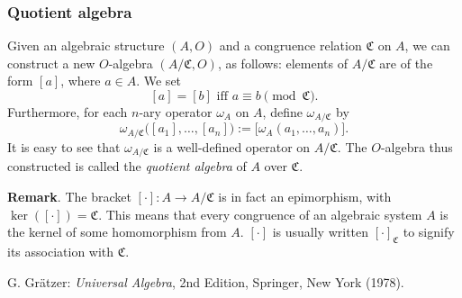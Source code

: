 \documentclass[12pt]{article}
\begin{document}
\subsubsection*{Quotient algebra}

Given an algebraic structure $(A,O)$ and a congruence relation $\mathfrak{C}$ on $A$, we can construct a new $O$-algebra $(A/\mathfrak{C},O)$, as follows: elements of $A/\mathfrak{C}$ are of the form $[a]$, where $a\in A$.  We set $$[a]=[b]\mbox{ iff }a\equiv b\pmod {\mathfrak{C}}.$$  Furthermore, for each $n$-ary operator $\omega_A$ on $A$, define $\omega_{A/\mathfrak{C}}$ by $$\omega_{A/\mathfrak{C}}\big([a_1],\ldots,[a_n]\big):=\big[\omega_A(a_1,\ldots,a_n)\big].$$  It is easy to see that $\omega_{A/\mathfrak{C}}$ is a well-defined operator on $A/\mathfrak{C}$.  The $O$-algebra thus constructed is called the \emph{quotient algebra} of $A$ over $\mathfrak{C}$.

\textbf{Remark}.  The bracket $[\cdot]:A\to A/\mathfrak{C}$ is in fact an epimorphism, with  $\ker([\cdot])=\mathfrak{C}$.  This means that every congruence of an algebraic system $A$ is the kernel of some homomorphism from $A$.  $[\cdot]$ is usually written $[\cdot]_{\mathfrak{C}}$ to signify its association with $\mathfrak{C}$.

\begin{thebibliography}{7}
 G. Gr\"{a}tzer: {\em Universal Algebra}, 2nd Edition, Springer, New York (1978).
\end{thebibliography}
\end{document}
